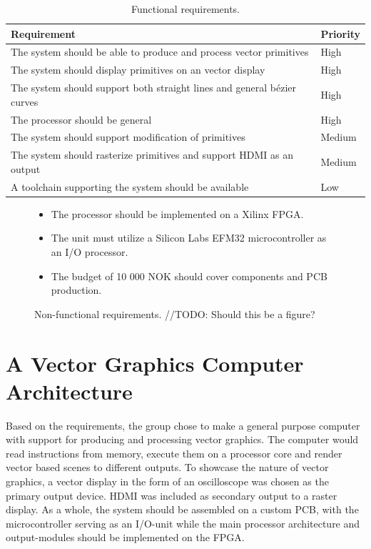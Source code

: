 \begin{table}[h!]
    \begin{tabular}{|l|l|}
        \hline
        \textbf{Requirement}                                                    & \textbf{Priority} \\ \hline
        The system should be able to produce and process vector primitives      & High     \\ \hline
        The system should display primitives on an vector display               & High     \\ \hline
        The system should support both straight lines and general bézier curves & High     \\ \hline
        The processor should be general                                         & High     \\ \hline
        The system should support modification of primitives                    & Medium   \\ \hline
        The system should rasterize primitives and support HDMI as an output    & Medium   \\ \hline
        A toolchain supporting the system should be available                   & Low      \\ \hline
    \end{tabular}
    \caption{Functional requirements.}
    \label{tbl:func_req}
\end{table}


\begin{figure}[h!]
    \begin{itemize}
        \item The processor should be implemented on a Xilinx FPGA.
        \item The unit must utilize a Silicon Labs EFM32 microcontroller as an I/O processor.
        \item The budget of 10 000 NOK should cover components and PCB production.
    \end{itemize}
    \caption{Non-functional requirements. //TODO: Should this be a figure?}
    \label{lst:non_func_req}
\end{figure}


\section{A Vector Graphics Computer Architecture}
Based on the requirements, the group chose to make a general purpose computer with support for producing and processing vector graphics.
The computer would read instructions from memory, execute them on a processor core and render vector based scenes to different outputs.
To showcase the nature of vector graphics, a vector display in the form of an oscilloscope was chosen as the primary output device.
HDMI was included as secondary output to a raster display.
As a whole, the system should be assembled on a custom PCB, with the microcontroller serving as an I/O-unit while the main processor architecture and output-modules should be implemented on the FPGA.

